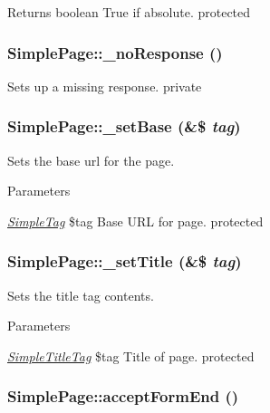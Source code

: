 \begin{DoxyReturn}{Returns}
boolean True if absolute.  protected 
\end{DoxyReturn}
\hypertarget{class_simple_page_a68568e98b615dd18e637a9e7d6cf49db}{
\subsubsection[{\_\-noResponse}]{\setlength{\rightskip}{0pt plus 5cm}SimplePage::\_\-noResponse ()}}
\label{class_simple_page_a68568e98b615dd18e637a9e7d6cf49db}
Sets up a missing response.  private \hypertarget{class_simple_page_a718984c5fe37d714c15320461ec06f6c}{
\subsubsection[{\_\-setBase}]{\setlength{\rightskip}{0pt plus 5cm}SimplePage::\_\-setBase (\&\$ {\em tag})}}
\label{class_simple_page_a718984c5fe37d714c15320461ec06f6c}
Sets the base url for the page. 
\begin{DoxyParams}{Parameters}
\item[{\em \hyperlink{class_simple_tag}{SimpleTag}}]\$tag Base URL for page.  protected \end{DoxyParams}
\hypertarget{class_simple_page_ae3b50ef1da0d1e177650ee8146394785}{
\subsubsection[{\_\-setTitle}]{\setlength{\rightskip}{0pt plus 5cm}SimplePage::\_\-setTitle (\&\$ {\em tag})}}
\label{class_simple_page_ae3b50ef1da0d1e177650ee8146394785}
Sets the title tag contents. 
\begin{DoxyParams}{Parameters}
\item[{\em \hyperlink{class_simple_title_tag}{SimpleTitleTag}}]\$tag Title of page.  protected \end{DoxyParams}
\hypertarget{class_simple_page_a7804f4a25baf7c9e1ea5d67f6705b9f6}{
\subsubsection[{acceptFormEnd}]{\setlength{\rightskip}{0pt plus 5cm}SimplePage::acceptFormEnd ()}}
